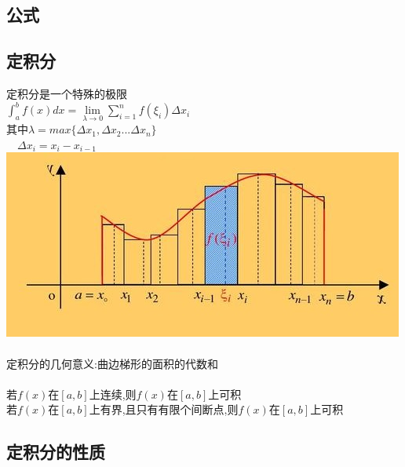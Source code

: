 \documentclass{article}
\begin{document}
\begin{flushleft}
	\LARGE
	
	\section{公式}
	
	\subsection{定积分}
	
	定积分是一个特殊的极限\\
	$\int_{a}^{b}f(x)dx=\lim\limits_{\lambda\to 0}\sum_{i=1}^{n}f(\xi_i)\Delta x_i$\\
	其中$\lambda = max\{\Delta x_1, \Delta x_2...\Delta x_n\}$\\
	\ \ $\Delta x_i=x_i-x_{i-1}$\\
	\includegraphics[scale=1.0]{2.jpg}\\
	~\\
	定积分的几何意义:曲边梯形的面积的代数和\\
	~\\
	若$f(x)$在$[a,b]$上连续,则$f(x)$在$[a,b]$上可积\\
	若$f(x)$在$[a,b]$上有界,且只有有限个间断点,则$f(x)$在$[a,b]$上可积\\
	
	\subsection{定积分的性质}
	

\end{flushleft}
\end{document}

